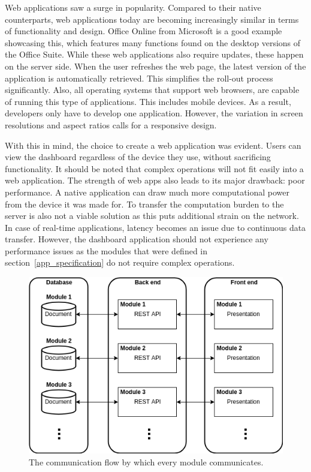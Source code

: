     Web applications saw a surge in popularity. Compared to their native counterparts, web applications today are becoming increasingly similar in terms of functionality and design. Office Online from Microsoft is a good example showcasing this, which features many functions found on the desktop versions of the Office Suite. While these web applications also require updates, these happen on the server side. When the user refreshes the web page, the latest version of the application is automatically retrieved. This simplifies the roll-out process significantly. Also, all operating systems that support web browsers, are capable of running this type of applications. This includes mobile devices. As a result, developers only have to develop one application. However, the variation in screen resolutions and aspect ratios calls for a responsive design.

    With this in mind, the choice to create a web application was evident. Users can view the dashboard regardless of the device they use, without sacrificing functionality. It should be noted that complex operations will not fit easily into a web application. The strength of web apps also leads to its major drawback: poor performance. A native application can draw much more computational power from the device it was made for. To transfer the computation burden to the server is also not a viable solution as this puts additional strain on the network. In case of real-time applications, latency becomes an issue due to continuous data transfer. However, the dashboard application should not experience any performance issues as the modules that were defined in section~\ref{app_specification} do not require complex operations.

    \begin{figure}[t]
        \centering
        \includegraphics[width=1\textwidth]{chapters/4_implementation/structure}
        \caption{The communication flow by which every module communicates.}\label{fig:structure}
    \end{figure}

